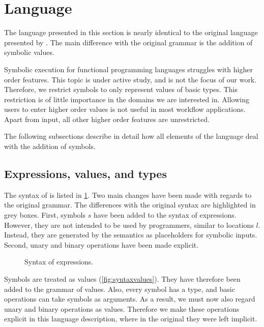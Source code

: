 
\section{Language}
\label{sec:language}

The language presented in this section is nearly identical to the original \TOPHAT language presented by \citet{Steenvoorden2019}.
The main difference with the original grammar is the addition of symbolic values.

Symbolic execution for functional programming languages struggles with higher order features.
This topic is under active study, and is not the focus of our work.
Therefore, we restrict symbols to only represent values of basic types.
This restriction is of little importance in the domains we are interested in.
Allowing users to enter higher order values is not useful in most workflow applications.
Apart from input, all other higher order features are unrestricted.

The following subsections describe in detail how all elements of the \TOPHAT language deal with the addition of symbols.



\subsection{Expressions, values, and types}
\label{sec:expressions}

The syntax of \TOPHAT is listed in \cref{fig:syntaxtophat}.
Two main changes have been made with regards to the original \TOPHAT grammar.
The differences with the original syntax are highlighted in grey boxes.
First, symbols $s$ have been added to the syntax of expressions.
However, they are not intended to be used by programmers, similar to locations $l$.
Instead, they are generated by the semantics as placeholders for symbolic inputs.
Second, unary and binary operations have been made explicit.

\begin{figure}[ht]
  \small
  \caption{Syntax of \TOPHAT expressions.}
  \label{fig:syntaxtophat}
\end{figure}

Symbols are treated as values (\cref{fig:syntaxvalues}).
They have therefore been added to the grammar of values.
Also, every symbol has a type, and basic operations can take symbols as arguments.
As a result, we must now also regard unary and binary operations as values.
Therefore we make these operations explicit in this language description,
where in the original they were left implicit.

